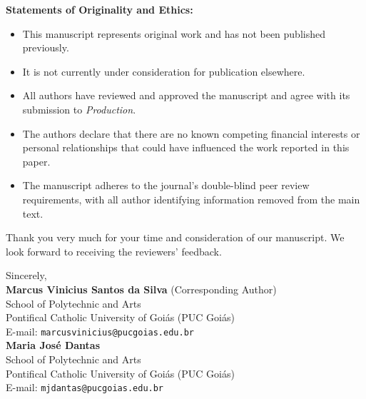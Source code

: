\documentclass[12pt,a4paper]{article}
\begin{document}
\vspace{1em}
\noindent\textbf{Statements of Originality and Ethics:}
\begin{itemize}[leftmargin=1.2cm,itemsep=0.3em]
  \item This manuscript represents original work and has not been published previously.
  \item It is not currently under consideration for publication elsewhere.
  \item All authors have reviewed and approved the manuscript and agree with its submission to \textit{Production}.
  \item The authors declare that there are no known competing financial interests or personal relationships that could have influenced the work reported in this paper.
  \item The manuscript adheres to the journal's double-blind peer review requirements, with all author identifying information removed from the main text.
\end{itemize}

\vspace{1em}
\noindent Thank you very much for your time and consideration of our manuscript. We look forward to receiving the reviewers' feedback.

\vspace{2em}
\noindent Sincerely,\\[1.5em]
\textbf{Marcus Vinicius Santos da Silva} (Corresponding Author)\\
School of Polytechnic and Arts\\
Pontifical Catholic University of Goi{\'a}s (PUC Goi{\'a}s)\\
E-mail: \texttt{marcusvinicius@pucgoias.edu.br}\\[1em]
\textbf{Maria Jos{\'e} Dantas}\\
School of Polytechnic and Arts\\
Pontifical Catholic University of Goi{\'a}s (PUC Goi{\'a}s)\\
E-mail: \texttt{mjdantas@pucgoias.edu.br}
\end{document}
